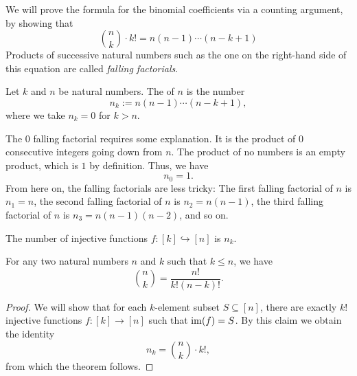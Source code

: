 We will prove the formula for the binomial coefficients via a counting argument, by showing that
\begin{equation*}
  \binom{n}{k}\cdot k!= n(n-1)\cdots (n-k+1)
\end{equation*}
Products of successive natural numbers such as the one on the right-hand side of this equation are called \emph{falling factorials}.

\begin{definition}
  Let $k$ and $n$ be natural numbers. The  of $n$ is the number
  \begin{equation*}
    n_{k}:=n(n-1)\cdots (n-k+1),
  \end{equation*}
  where we take $n_k=0$ for $k>n$.
\end{definition}

The $0$\supth{} falling factorial requires some explanation. It is the product of $0$ consecutive integers going down from $n$. The product of no numbers is an empty product, which is $1$ by definition. Thus, we have
\begin{equation*}
  n_0=1.
\end{equation*}
From here on, the falling factorials are less tricky: The first falling factorial of $n$ is $n_1=n$, the second falling factorial of $n$ is $n_2=n(n-1)$, the third falling factorial of $n$ is $n_3=n(n-1)(n-2)$, and so on.

\begin{theorem}
  The number of injective functions $f:[k]\hookrightarrow[n]$ is $n_k$. 
\end{theorem}

\begin{theorem} For any two natural numbers $n$ and $k$ such that $k\leq n$, we have
  \begin{equation*}
    \binom{n}{k}=\frac{n!}{k!(n-k)!}.
  \end{equation*}
\end{theorem}

\begin{proof}
  We will show that for each $k$-element subset $S\subseteq [n]$, there are exactly $k!$ injective functions $f:[k]\to[n]$ such that $\operatorname{im}(f)=S$. By this claim we obtain the identity
  \begin{equation*}
    n_k=\binom{n}{k}\cdot k!,
  \end{equation*}
  from which the theorem follows.  
\end{proof}

